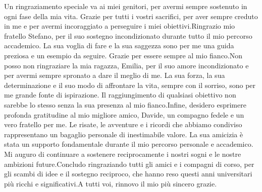 \documentclass[a4paper, 12pt]{report}
\begin{document}
\begin{sloppypar}
{Un ringraziamento speciale va ai miei genitori, per avermi sempre sostenuto in ogni fase della mia vita. Grazie per tutti i vostri sacrifici, per aver sempre creduto in me e per avermi incoraggiato a perseguire i miei obiettivi.\vspace{0.3cm}\newline Ringrazio mio fratello Stefano, per il suo sostegno incondizionato durante tutto il mio percorso accademico. La sua voglia di fare e la sua saggezza sono per me una guida preziosa e un esempio da seguire. Grazie per essere sempre al mio fianco.\vspace{0.3cm}\newline Non posso non ringraziare la mia ragazza, Emilia, per il suo amore incondizionato e per avermi sempre spronato a dare il meglio di me. La sua forza, la sua determinazione e il suo modo di affrontare la vita, sempre con il sorriso, sono per me grande fonte di ispirazione. Il raggiungimento di qualsiasi obiettivo non sarebbe lo stesso senza la sua presenza al mio fianco.\vspace{0.3cm}\newline Infine, desidero esprimere profonda gratitudine al mio migliore amico, Davide, un compagno fedele e un vero fratello per me. Le risate, le avventure e i ricordi che abbiamo condiviso rappresentano un bagaglio personale di inestimabile valore. La sua amicizia è stata un supporto fondamentale durante il mio percorso personale e accademico. Mi auguro di continuare a sostenere reciprocamente i nostri sogni e le nostre ambizioni future.\vspace{0.3cm}\newline Concludo ringraziando tutti gli amici e i compagni di corso, per gli scambi di idee e il sostegno reciproco, che hanno reso questi anni universitari più ricchi e significativi.\vspace{0.3cm}\newline A tutti voi, rinnovo il mio più sincero grazie.
}
\end{sloppypar}



\end{document}
